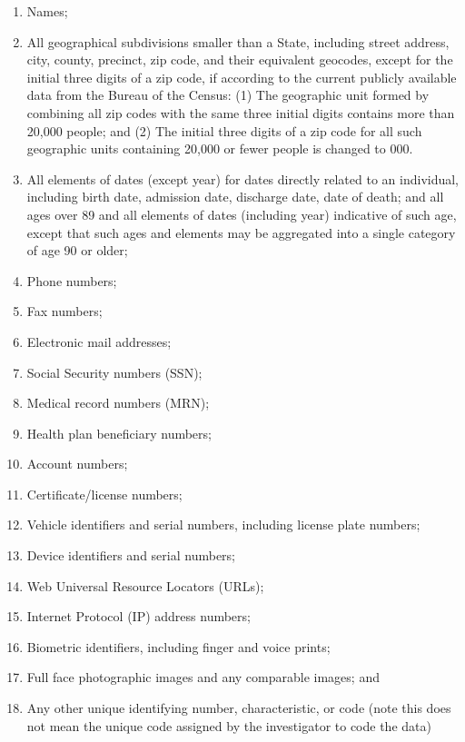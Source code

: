 \documentclass[
  letterpaper,
  DIV=11,
  numbers=noendperiod]{scrreprt}
\providecommand{\tightlist}{%
  \setlength{\itemsep}{0pt}\setlength{\parskip}{0pt}}\usepackage{longtable,booktabs,array}
\begin{document}
\begin{enumerate}
\def\labelenumi{\arabic{enumi}.}
\tightlist
\item
  Names;
\item
  All geographical subdivisions smaller than a State, including street
  address, city, county, precinct, zip code, and their equivalent
  geocodes, except for the initial three digits of a zip code, if
  according to the current publicly available data from the Bureau of
  the Census: (1) The geographic unit formed by combining all zip codes
  with the same three initial digits contains more than 20,000 people;
  and (2) The initial three digits of a zip code for all such geographic
  units containing 20,000 or fewer people is changed to 000.
\item
  All elements of dates (except year) for dates directly related to an
  individual, including birth date, admission date, discharge date, date
  of death; and all ages over 89 and all elements of dates (including
  year) indicative of such age, except that such ages and elements may
  be aggregated into a single category of age 90 or older;
\item
  Phone numbers;
\item
  Fax numbers;
\item
  Electronic mail addresses;
\item
  Social Security numbers (SSN);
\item
  Medical record numbers (MRN);
\item
  Health plan beneficiary numbers;
\item
  Account numbers;
\item
  Certificate/license numbers;
\item
  Vehicle identifiers and serial numbers, including license plate
  numbers;
\item
  Device identifiers and serial numbers;
\item
  Web Universal Resource Locators (URLs);
\item
  Internet Protocol (IP) address numbers;
\item
  Biometric identifiers, including finger and voice prints;
\item
  Full face photographic images and any comparable images; and
\item
  Any other unique identifying number, characteristic, or code (note
  this does not mean the unique code assigned by the investigator to
  code the data)
\end{enumerate}
\end{document}
